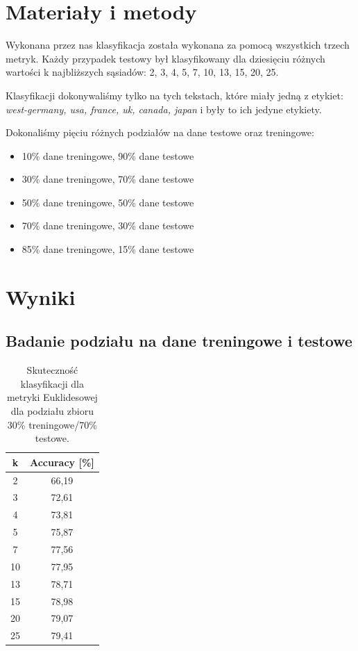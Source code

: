 \documentclass{classrep}
\begin{document}
  

\section{Materiały i metody} %
Wykonana przez nas klasyfikacja została wykonana za pomocą wszystkich trzech metryk. Każdy przypadek testowy był klasyfikowany dla dziesięciu różnych wartości k najbliższych sąsiadów: 2, 3, 4, 5, 7, 10, 13, 15, 20, 25.

Klasyfikacji dokonywaliśmy tylko na tych tekstach, które miały jedną z etykiet: \textsl{west-germany, usa, france, uk, canada, japan} i były to ich jedyne etykiety.

Dokonaliśmy pięciu różnych podziałów na dane testowe oraz treningowe:
\begin{itemize}
\item 10\% dane treningowe, 90\% dane testowe
\item 30\% dane treningowe, 70\% dane testowe
\item 50\% dane treningowe, 50\% dane testowe
\item 70\% dane treningowe, 30\% dane testowe
\item 85\% dane treningowe, 15\% dane testowe
\end{itemize}

\section{Wyniki} %
\subsection{Badanie podziału na dane treningowe i testowe}

\begin{table}[h!]
	\centering
	\begin{tabular} {c c}
		\hline
		\textbf{k} & \textbf{Accuracy [\%]} \\ [0.5ex] 
		\hline
		\hline 
		2 & 66,19 \\ 
		3 & 72,61 \\
		4 & 73,81 \\
		5 & 75,87 \\
		7 & 77,56 \\
		10 & 77,95  \\
		13 & 78,71 \\ 
		15 & 78,98 \\
		20 & 79,07 \\
		25 & 79,41 \\
		\hline
	\end{tabular}
	\caption{Skuteczność klasyfikacji dla metryki Euklidesowej dla podziału zbioru 30\% treningowe/70\% testowe. }
\end{table}
\end{document}
